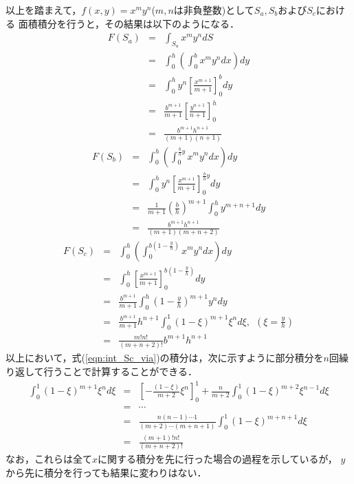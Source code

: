 \documentclass[10pt,a4j]{jarticle}
\begin{document}
以上を踏まえて，$f(x,y)=x^my^n$($m,n$は非負整数)として$S_a, S_b$および$S_c$における
面積積分を行うと，その結果は以下のようになる．
\begin{eqnarray}
	F(S_a) &= & 
	\int_{S_a}x^my^ndS \nonumber \\
	&= & 
	\int_0^h \left( \int_0^b x^m y^n dx \right) dy \nonumber \\
	&= & 
	\int_0^h y^n \left[ \frac{x^{m+1}}{m+1} \right]_0^b dy \nonumber \\
	&= & 
	\frac{b^{m+1}}{m+1}
	\left[
		\frac{y^{n+1}}{n+1}
	\right]_0^h
	\nonumber
	\\
	&= & 
	\frac{ b^{m+1} h^{n+1}}{(m+1)(n+1)}
	\label{eqn:int_Sa_xmyn}
\end{eqnarray}
\begin{eqnarray}
	F(S_b) 
	&= & 
	\int_0^h \left(\int_0^{\frac{b}{h}y} x^my^ndx \right) dy
	\nonumber
	\\
	&= & 
	\int_0^h y^n \left[\frac{x^{m+1}}{m+1}\right]_0^{\frac{b}{h}y}dy 
	\nonumber
	\\
	&= & 
	\frac{1}{m+1}\left(\frac{b}{h}\right)^{m+1} \int_0^h y^{m+n+1}dy 
	\nonumber
	\\
	&= & 
	\frac{b^{m+1}h^{n+1}}{(m+1)(m+n+2)}
	\label{eqn:int_Sb_xmyn}
\end{eqnarray}
\begin{eqnarray}
	F(S_c)&= & 
	\int_0^h \left(\int_0^{b\left( 1-\frac{y}{h}\right) } x^my^ndx \right) dy
	\nonumber
	\\
	&=&
	\int_0^h \left[ \frac{x^{m+1}}{m+1}\right]_0^{b\left(1-\frac{y}{h}\right)} dy \nonumber
	\\
	&=&
	\frac{b^{m+1}}{m+1} \int_0^h \left( 1-\frac{y}{h} \right)^{m+1} y^n dy 
	\nonumber
	\\
	&=&
	\frac{b^{m+1}}{m+1}h^{n+1} \int_0^1 \left( 1-\xi \right)^{m+1} \xi^n d\xi, \ \ \left(\xi=\frac{y}{h}\right) 
	\label{eqn:int_Sc_via}
	\\
	&=&
	\frac{m!n!}{(m+n+2)!}b^{m+1}h^{n+1}
	\label{eqn:int_Sc_xmyn}
\end{eqnarray}
以上において，式(\ref{eqn:int_Sc_via})の積分は，次に示すように部分積分を$n$回繰り返して行うことで計算することができる．
\begin{eqnarray}
	\int_0^1 \left( 1-\xi \right)^{m+1} \xi^n d\xi
	&=&
	\left[-\frac{(1-\xi)}{m+2}\xi^n\right]_0^1 + \frac{n}{m+2}\int_0^1 (1-\xi)^{m+2}\xi^{n-1}d\xi
	\nonumber
	\\
	&=&
	\cdots
	\nonumber
	\\
	&=&
	\frac{n(n-1)\cdots 1}{(m+2)\cdots (m+n+1)} \int_0^1 (1-\xi)^{m+n+1}d\xi 
	\nonumber
	\\
	&=&
	\frac{(m+1)! n!}{(m+n+2)!}
	\label{eqn:int_by_part}
\end{eqnarray}
なお，これらは全て$x$に関する積分を先に行った場合の過程を示しているが，
$y$から先に積分を行っても結果に変わりはない．
\end{document}
